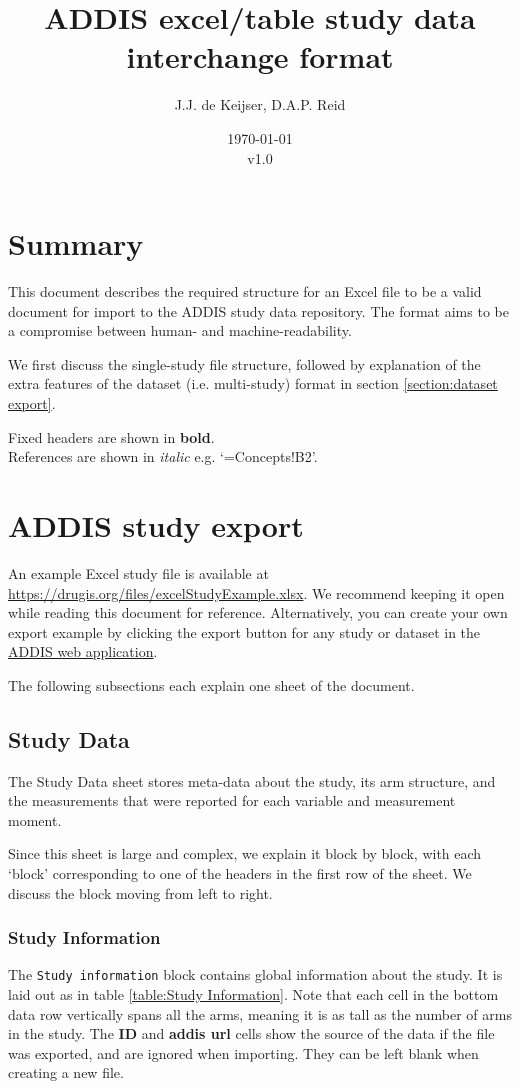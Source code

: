 \documentclass[a4paper,10pt]{article}
\title{ADDIS excel/table study data interchange format}
\author{J.J. de Keijser, D.A.P. Reid}
\date{\today\\v1.0}
\begin{document}
\maketitle
\section{Summary}

This document describes the required structure for an Excel file to be a valid document for import to the ADDIS study data repository. The format aims to be a compromise between human- and machine-readability.

We first discuss the single-study file structure, followed by explanation of the extra features of the dataset (i.e. multi-study) format in section \ref{section:dataset export}.

Fixed headers are shown in \textbf{bold}.\\
References are shown in \textit{italic} e.g. `=Concepts!B2'.\\

\section{ADDIS study export}
An example Excel study file is available at \url{https://drugis.org/files/excelStudyExample.xlsx}. We recommend keeping it open while reading this document for reference. Alternatively, you can create your own export example by clicking the export button for any study or dataset in the \href{https://addis.drugis.org/}{ADDIS web application}.


The following subsections each explain one sheet of the document.

\subsection{Study Data}
The Study Data sheet stores meta-data about the study, its arm structure, and the measurements that were reported for each variable and measurement moment.

Since this sheet is large and complex, we explain it block by block, with each `block' corresponding to one of the headers in the first row of the sheet. We discuss the block moving from left to right.

\subsubsection{Study Information}
The \texttt{Study information} block contains global information about the study. It is laid out as in table \ref{table:Study Information}. Note that each cell in the bottom data row vertically spans all the arms, meaning it is as tall as the number of arms in the study. The \textbf{ID} and \textbf{addis url} cells show the source of the data if the file was exported, and are ignored when importing. They can be left blank when creating a new file.
\end{document}
